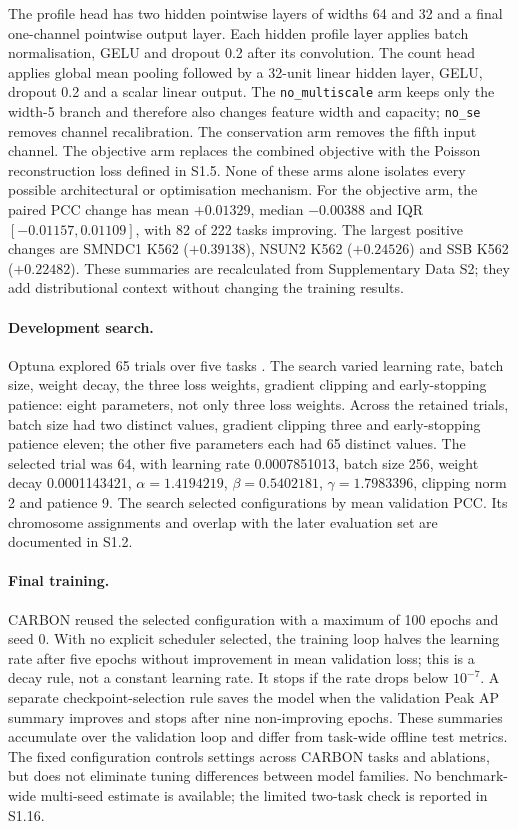 \documentclass[11pt]{article}
\begin{document}
The profile head has two hidden pointwise layers of widths 64 and 32 and a final one-channel pointwise output layer. Each hidden profile layer applies batch normalisation, GELU and dropout 0.2 after its convolution. The count head applies global mean pooling followed by a 32-unit linear hidden layer, GELU, dropout 0.2 and a scalar linear output. The \texttt{no\_multiscale} arm keeps only the width-5 branch and therefore also changes feature width and capacity; \texttt{no\_se} removes channel recalibration. The conservation arm removes the fifth input channel. The objective arm replaces the combined objective with the Poisson reconstruction loss defined in S1.5. None of these arms alone isolates every possible architectural or optimisation mechanism. For the objective arm, the paired PCC change has mean $+0.01329$, median $-0.00388$ and IQR $[-0.01157,0.01109]$, with 82 of 222 tasks improving. The largest positive changes are SMNDC1 K562 ($+0.39138$), NSUN2 K562 ($+0.24526$) and SSB K562 ($+0.22482$). These summaries are recalculated from Supplementary Data S2; they add distributional context without changing the training results.

\paragraph{Development search.} Optuna explored 65 trials over five tasks \citep{akiba2019optuna}. The search varied learning rate, batch size, weight decay, the three loss weights, gradient clipping and early-stopping patience: eight parameters, not only three loss weights. Across the retained trials, batch size had two distinct values, gradient clipping three and early-stopping patience eleven; the other five parameters each had 65 distinct values. The selected trial was 64, with learning rate 0.0007851013, batch size 256, weight decay 0.0001143421, $\alpha=1.4194219$, $\beta=0.5402181$, $\gamma=1.7983396$, clipping norm 2 and patience 9. The search selected configurations by mean validation PCC. Its chromosome assignments and overlap with the later evaluation set are documented in S1.2.

\paragraph{Final training.} CARBON reused the selected configuration with a maximum of 100 epochs and seed 0. With no explicit scheduler selected, the training loop halves the learning rate after five epochs without improvement in mean validation loss; this is a decay rule, not a constant learning rate. It stops if the rate drops below $10^{-7}$. A separate checkpoint-selection rule saves the model when the validation Peak AP summary improves and stops after nine non-improving epochs. These summaries accumulate over the validation loop and differ from task-wide offline test metrics. The fixed configuration controls settings across CARBON tasks and ablations, but does not eliminate tuning differences between model families. No benchmark-wide multi-seed estimate is available; the limited two-task check is reported in S1.16.
\end{document}
